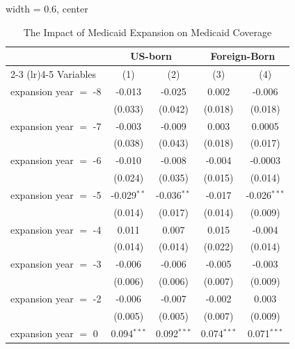 
\begin{table}[htbp]
   \caption{The Impact of Medicaid Expansion on Medicaid Coverage }
   \centering
   \small
   \begin{adjustbox}{width = 0.6\textwidth, center}
      \renewcommand*{\arraystretch}{0.5}
      \begin{tabular}{lcccc}
         \tabularnewline \midrule \midrule
          & \multicolumn{2}{c}{US-born} & \multicolumn{2}{c}{Foreign-Born} \\ \cmidrule(lr){2-3} \cmidrule(lr){4-5}
         Variables             & (1)           & (2)           & (3)           & (4)\\  
         \midrule 
         expansion year $=$ -8 & -0.013        & -0.025        & 0.002         & -0.006\\   
                               & (0.033)       & (0.042)       & (0.018)       & (0.018)\\   
         expansion year $=$ -7 & -0.003        & -0.009        & 0.003         & 0.0005\\   
                               & (0.038)       & (0.043)       & (0.018)       & (0.017)\\   
         expansion year $=$ -6 & -0.010        & -0.008        & -0.004        & -0.0003\\   
                               & (0.024)       & (0.035)       & (0.015)       & (0.014)\\   
         expansion year $=$ -5 & -0.029$^{**}$ & -0.036$^{**}$ & -0.017        & -0.026$^{***}$\\   
                               & (0.014)       & (0.017)       & (0.014)       & (0.009)\\   
         expansion year $=$ -4 & 0.011         & 0.007         & 0.015         & -0.004\\   
                               & (0.014)       & (0.014)       & (0.022)       & (0.014)\\   
         expansion year $=$ -3 & -0.006        & -0.006        & -0.005        & -0.003\\   
                               & (0.006)       & (0.006)       & (0.007)       & (0.009)\\   
         expansion year $=$ -2 & -0.006        & -0.007        & -0.002        & 0.003\\   
                               & (0.005)       & (0.005)       & (0.007)       & (0.009)\\   
         expansion year $=$ 0  & 0.094$^{***}$ & 0.092$^{***}$ & 0.074$^{***}$ & 0.071$^{***}$\\   

\end{tabular}
\end{adjustbox}
\end{table}
